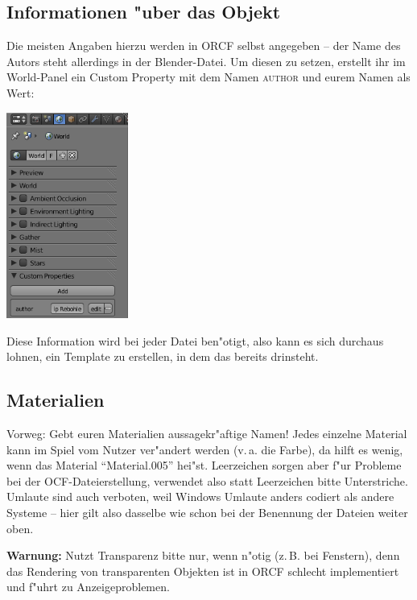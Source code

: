 \documentclass[a4paper]{article}
\newcommand{\ccaption}[1]{\textsc{#1}}
\newcommand{\warning}[1]{\textbf{Warnung:} #1 \par}
\begin{document}
\subsection{Informationen "uber das Objekt}
Die meisten Angaben hierzu werden in ORCF selbst angegeben -- der Name des Autors steht allerdings in der Blender-Datei. Um diesen zu setzen, erstellt ihr
im World-Panel ein Custom Property mit dem Namen \ccaption{author} und eurem Namen als Wert:
\begin{center}
\includegraphics[width=40mm]{../images/blender/world-author.png}
\end{center}
Diese Information wird bei jeder Datei ben"otigt, also kann es sich durchaus lohnen, ein Template zu erstellen, in dem das bereits drinsteht.

\subsection{Materialien}
Vorweg: Gebt euren Materialien aussagekr"aftige Namen! Jedes einzelne Material kann im Spiel vom Nutzer ver"andert werden (v.\,a. die Farbe), da hilft
es wenig, wenn das Material "`Material.005"' hei"st. Leerzeichen sorgen aber f"ur Probleme bei der OCF-Dateierstellung, verwendet also statt Leerzeichen
bitte Unterstriche. Umlaute sind auch verboten, weil Windows Umlaute anders codiert als andere Systeme -- hier gilt also dasselbe wie schon bei der
Benennung der Dateien weiter oben.

\warning{Nutzt Transparenz bitte nur, wenn n"otig (z.\,B. bei Fenstern), denn das Rendering von transparenten Objekten ist in ORCF schlecht implementiert
  und f"uhrt zu Anzeigeproblemen.}
\end{document}
